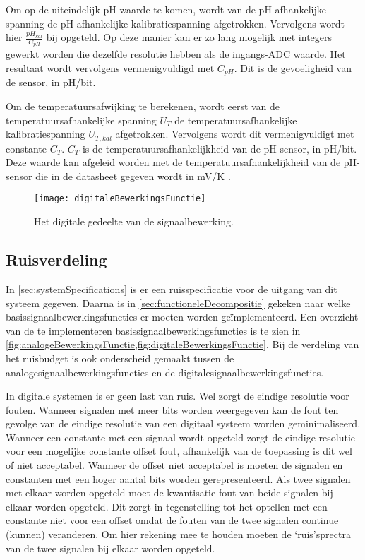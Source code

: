 Om op de uiteindelijk pH waarde te komen, wordt van de pH-afhankelijke spanning de pH-afhankelijke kalibratiespanning afgetrokken. Vervolgens wordt hier $\frac{pH_{kal}}{C_{pH}}$ bij opgeteld. Op deze manier kan er zo lang mogelijk met integers gewerkt worden die dezelfde resolutie hebben als de ingangs-ADC waarde. Het resultaat wordt vervolgens vermenigvuldigd met $C_{pH}$. Dit is de gevoeligheid van de sensor, in pH/bit.

Om de temperatuursafwijking te berekenen, wordt eerst van de temperatuursafhankelijke spanning $U_T$ de temperatuursafhankelijke kalibratiespanning $U_{T,kal}$ afgetrokken. Vervolgens wordt dit vermenigvuldigt met constante $C_T$. $C_T$ is de temperatuursafhankelijkheid van de pH-sensor, in pH/bit. Deze waarde kan afgeleid worden met de temperatuursafhankelijkheid van de pH-sensor die in de datasheet gegeven wordt in mV/K \cite{isfet}.

\begin{figure}[!htbp]
    \centering
    \texttt{[image: digitaleBewerkingsFunctie]}
    \caption{Het digitale gedeelte van de signaalbewerking.}
    \label{fig:digitaleBewerkingsFunctie}
\end{figure}


\subsection{Ruisverdeling}
In \cref{sec:systemSpecifications} is er een ruisspecificatie voor de uitgang van dit systeem gegeven. Daarna is in \cref{sec:functioneleDecompositie} gekeken naar welke basissignaalbewerkingsfuncties er moeten worden geïmplementeerd. Een overzicht van de te implementeren basissignaalbewerkingsfuncties is te zien in \cref{fig:analogeBewerkingsFunctie,fig:digitaleBewerkingsFunctie}. Bij de verdeling van het ruisbudget is ook onderscheid gemaakt tussen de analogesignaalbewerkingsfuncties en de digitalesignaalbewerkingsfuncties.

In digitale systemen is er geen last van ruis. Wel zorgt de eindige resolutie voor fouten. Wanneer signalen met meer bits worden weergegeven kan de fout ten gevolge van de eindige resolutie van een digitaal systeem worden geminimaliseerd. Wanneer een constante met een signaal wordt opgeteld zorgt de eindige resolutie voor een mogelijke constante offset fout, afhankelijk van de toepassing is dit wel of niet acceptabel. Wanneer de offset niet acceptabel is moeten de signalen en constanten met een hoger aantal bits worden gerepresenteerd. Als twee signalen met elkaar worden opgeteld moet de kwantisatie fout van beide signalen bij elkaar worden opgeteld. Dit zorgt in tegenstelling tot het optellen met een constante niet voor een offset omdat de fouten van de twee signalen continue (kunnen) veranderen. Om hier rekening mee te houden moeten de `ruis'sprectra van de twee signalen bij elkaar worden opgeteld.

